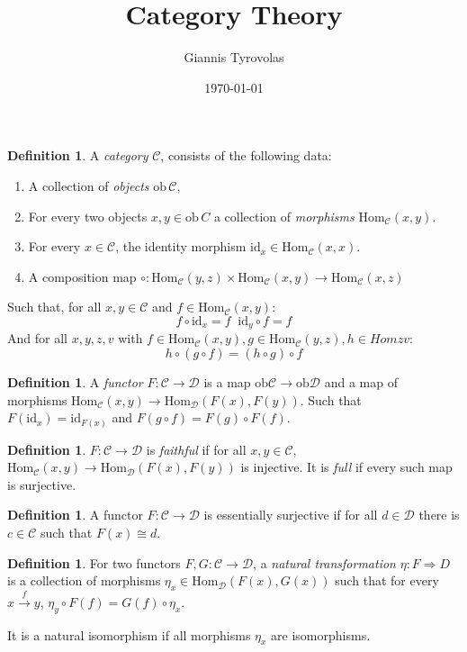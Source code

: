 \documentclass[a4paper,10pt]{article}
\title{Category Theory}
\author{Giannis Tyrovolas}
\date{\today}
\theoremstyle{definition}
\newtheorem{definition}[theorem]{Definition}
\newcommand{\Hom}[3][C]{\mathrm{Hom}_\mathcal{#1}(#2, #3)}
\newcommand{\C}{\mathcal{C}}
\newcommand{\D}{\mathcal{D}}
\newcommand{\id}{\mathrm{id}}
\begin{document}
\begin{definition}
    A \emph{category} $\mathcal{C}$, consists of the following data: 
    \begin{enumerate}
        \item A collection of \emph{objects} $\mathrm{ob}\,\mathcal{C}$,
        \item For every two objects $x, y \in \mathrm{ob} \, C$ a collection of \emph{morphisms} $\Hom{x}{y}$.
        \item For every $x \in \mathcal{C}$, the identity morphism $\mathrm{id}_x \in \Hom{x}{x}$.
        \item A composition map $\circ \colon \Hom{y}{z} \times \Hom{x}{y} \longrightarrow \Hom{x}{z}$ 
    \end{enumerate}
    Such that, for all $x, y \in \C$ and $f \in \Hom{x}{y}$: 
    \[
        f \circ \mathrm{id}_x = f \; \; \mathrm{id}_y \circ f = f
    \]
    And for all $x, y, z, v$ with $f \in \Hom{x}{y}, g \in \Hom{y}{z}, h \in Hom{z}{v}$:
    \[
        h \circ (g \circ f) = (h \circ g) \circ f
    \]
\end{definition}

\begin{definition}
    A \emph{functor} $F \colon \C \longrightarrow \D$ is a map $\mathrm{ob} \C \rightarrow \mathrm{ob} \D$ and a map of morphisms $\Hom[C]{x}{y} \rightarrow \Hom[D]{F(x)}{F(y)}$. Such that $F(\id_x) = \id_{F(x)}$ and $F(g \circ f) = F(g) \circ F(f)$.
\end{definition}

\begin{definition}
    $F \colon \C \rightarrow \D$ is \emph{faithful} if for all $x, y \in \C$, $\Hom{x}{y} \rightarrow \Hom[D]{F(x)}{F(y)}$ is injective.
    It is \emph{full} if every such map is surjective.
\end{definition}

\begin{definition}
    A functor $F \colon \C \rightarrow \D$ is essentially surjective if for all $d \in \D$ there is $c \in \C$ such that $F(x) \cong d$.
\end{definition}

\begin{definition}
    For two functors $F, G \colon \C \rightarrow \D$, a \emph{natural transformation} $\eta \colon F \Rightarrow D$ is a collection of morphisms $\eta_x \in \Hom[D]{F(x)}{G(x)}$ such that for every $x \xrightarrow{f} y$, $\eta_y \circ F(f) = G(f) \circ \eta_x$. 
\end{definition}
It is a natural isomorphism if all morphisms $\eta_x$ are isomorphisms.
\end{document}
